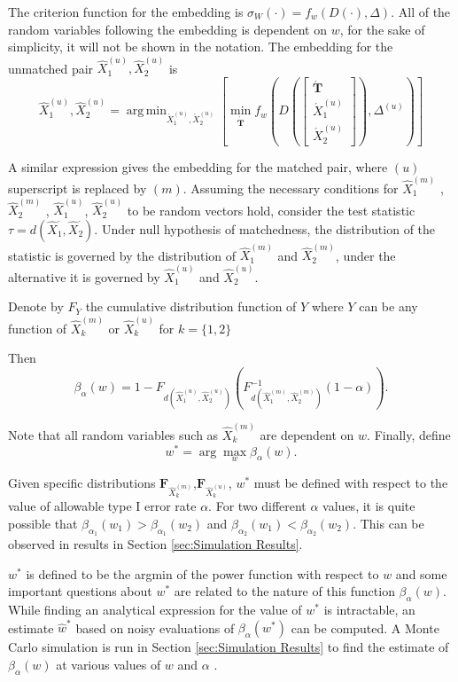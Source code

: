 \documentclass[11pt]{article} %
\DeclareMathOperator*{\argmin}{arg\,min}
\begin{document}
 The criterion function for the embedding is $\sigma_W(\cdot) =f_w(D({\cdot}),\Delta)$. All of the random variables following the embedding is dependent on $w$, for the sake of simplicity, it will not be shown in the notation. The embedding for the unmatched pair ${\hat{X}_{1}^{(u)},\hat{X}_{2}^{(u)}}$  is 
 \[
{\hat{X}_{1}^{(u)},\hat{X}_{2}^{(u)}}
=\argmin_{\acute{X}_{1}^{(u)}, \acute{X}_{2}^{(u)}}\left[\min_{\mathbf{\acute{T}}}
{f_w\left(
D\left(
\left[
\begin{array}{c}
\acute{\mathbf{T}} \\
\acute{X}_{1}^{(u)} \\
\acute{X}_{2}^{(u)}
\end {array}
\right]
\right),
\Delta^{(u)}
\right)
}
\right]
\]

A similar expression gives the embedding for the matched pair, where $(u)$ superscript   is replaced by $(m)$.
 Assuming the necessary conditions  for $\hat{X}_{1}^{(m)}$ , $\hat{X}_{2}^{(m)}$ , $\hat{X}_{1}^{(u)}$, $\hat{X}_{2}^{(u)}$ to be random vectors hold, consider the test statistic $\tau=d(\hat{X}_{1}^{\cdot},\hat{X}_{2}^{\cdot})$. Under null hypothesis of matchedness, the distribution of the statistic is governed by the distribution of $\hat{X}_{1}^{(m)}$ and $\hat{X}_{2}^{(m)}$, under the alternative it is governed by  $\hat{X}_{1}^{(u)}$ and $\hat{X}_{2}^{(u)}$.

Denote by $F_Y$ the   cumulative distribution function of  $Y$ where $Y$ can be  any function of $\hat{X}_{k}^{(m)}$ or $\hat{X}_{k}^{(u)}$  for $k=\{1,2\}$ 



 Then $$\beta_{\alpha}\left( w\right)=1-F_{d \left(\hat{X}_{1}^{(u)},\hat{X}_{2}^{(u)}\right)}(F_{d\left(\hat{X}_{1}^{(m)},\hat{X}_{2}^{(m)}\right)}^{-1}(1-\alpha)).$$

 Note that all random variables such as $\hat{X}_{k}^{(m)}$  are dependent on $w$. Finally, define $$w^{*}=\arg\max_w{\beta_{\alpha}\left( w\right)}. $$


Given  specific distributions $\mathbf{F}_{ \hat{X}_{k}^{(m)}}$,$\mathbf{F}_{ \hat{X}_{k}^{(u)}}$,   $w^*$ must be defined with respect to the value of allowable type I error rate $\alpha$.  For two different $\alpha$ values, it is quite possible that $\beta_{\alpha_1}(w_1)>\beta_{\alpha_1}(w_2)$  and $\beta_{\alpha_2}(w_1)<\beta_{\alpha_2}(w_2)$. This can be observed in results in Section \ref{sec:Simulation Results}.  

 $w^*$ is defined to be the argmin of  the power function with respect to $w$ and some important questions about $w^*$ are  related to the nature of this function $\beta_{\alpha}\left( w\right)$.
While finding an analytical expression for the value of $w^*$ is intractable, an estimate $\hat{w}^*$  based on noisy evaluations of $\beta_{\alpha}(w^*)$ can be computed.  A Monte Carlo simulation is run in  Section  \ref{sec:Simulation Results} 
to find the estimate of $\beta_{\alpha}\left( w\right)$ at various values of $w$ and $\alpha$ .
\end{document}
